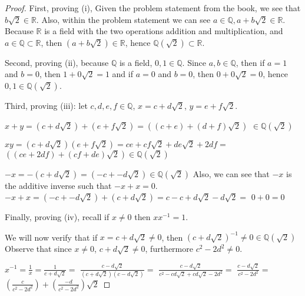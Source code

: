 \documentclass[a4paper]{article}
\begin{document}
\begin{myparindent}{0pt}
\begin{proof}
  First, proving (i), Given the problem statement from the book, we see that $b \sqrt{2} \in \mathbb{R}$.
  Also, within the problem statement we can see $a \in \mathbb{Q}, a + b \sqrt{2} \in \mathbb{R}$.
  Because $\mathbb{R}$ is a field with the two operations addition and multiplication,
  and $a \in \mathbb{Q} \subset \mathbb{R}$, then $(a + b\sqrt{2}) \in \mathbb{R}$,
  hence $\mathbb{Q}(\sqrt{2}) \subset \mathbb{R}$. \newline

  Second, proving (ii), because $\mathbb{Q}$ is a field, $0, 1 \in \mathbb{Q}$.
  Since $a, b \in \mathbb{Q}$, then if $a = 1$ and $b = 0$, then
  $1 + 0 \sqrt{2} = 1$ and if $a = 0$ and $b = 0$, then $0 + 0 \sqrt{2} = 0$,
  hence $0, 1 \in \mathbb{Q}(\sqrt{2})$. \newline

  Third, proving (iii): let $c, d, e, f \in \mathbb{Q}$, $x = c + d \sqrt{2}$,
  $y = e + f \sqrt{2}$. \newline

    $x + y = (c + d \sqrt{2}) + (e + f \sqrt{2}) = ((c + e) + (d + f) \sqrt{2})$
    $\in \mathbb{Q}(\sqrt{2})$ \newline

    $xy = (c + d \sqrt{2})(e + f \sqrt{2}) = ce + cf \sqrt{2} + de \sqrt{2} + 2df =$ \newline
    $((ce + 2df) + (cf + de) \sqrt{2}) \in \mathbb{Q}(\sqrt{2})$ \newline

    $-x = -(c + d \sqrt{2}) = (-c + -d \sqrt{2}) \in \mathbb{Q}(\sqrt{2})$ \newline
    Also, we can see that $-x$ is the additive inverse such that $-x + x = 0$. \newline
    $-x + x = (-c + -d \sqrt{2}) + (c + d \sqrt{2}) = c - c + d \sqrt{2} - d \sqrt{2} =$
    $0 + 0 = 0$ \newline

    Finally, proving (iv), recall if $x \ne 0$ then $xx^{-1} = 1$. \newline

    We will now verify that if $x = c + d \sqrt{2} \ne 0$, then
    $(c + d \sqrt{2})^{-1} \ne 0 \in \mathbb{Q}(\sqrt{2})$
    Observe that since $x \ne 0$, $c + d \sqrt{2} \ne 0$, furthermore
    $c^2 - 2d^2 \ne 0$. \newline

    $x^{-1} = \frac{1}{x} = \frac{1}{c + d \sqrt{2}} = $
    $\frac{c - d \sqrt{2}}{(c + d \sqrt{2})(c - d \sqrt{2})} =$
    $\frac{c - d \sqrt{2}}{c^2 - cd \sqrt{2} + cd \sqrt{2} - 2d^2} =$
    $\frac{c - d \sqrt{2}}{c^2 - 2d^2} =$ \newline
    $(\frac{c}{c^2 - 2 d^2}) + (\frac{-d}{c^2 - 2d^2}) \sqrt{2}$ \newline


\end{proof}
\end{myparindent}
\end{document}
